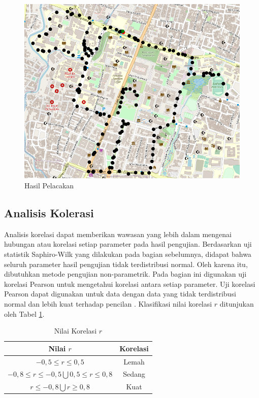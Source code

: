 \begin{figure}[H]
	\centering
	\includegraphics[width=12cm]{contents/chapter-4/pengujian-bergerak/tracked-route.png}
	\caption{Hasil Pelacakan}
	\label{Fig: moving-tracked-route}
\end{figure}

\subsection{Analisis Kolerasi}

Analisis korelasi dapat memberikan wawasan yang lebih dalam mengenai hubungan atau korelasi setiap parameter pada hasil pengujian. Berdasarkan uji statistik Saphiro-Wilk yang dilakukan pada bagian sebelumnya, didapat bahwa seluruh parameter hasil pengujian tidak terdistribusi normal. Oleh karena itu, dibutuhkan metode pengujian non-parametrik. Pada bagian ini digunakan uji korelasi Pearson untuk mengetahui korelasi antara setiap parameter. Uji korelasi Pearson dapat digunakan untuk data dengan data yang tidak terdistribusi normal dan lebih kuat terhadap pencilan \cite{Schober2018}. Klasifikasi nilai korelasi $r$ ditunjukan oleh Tabel \ref{Tab: korelasi-table}.

\begin{table}[H]
	\caption{Nilai Korelasi $r$ \cite{Carlton2012}}
	\vspace{0.5em}
	\centering
	\begin{tabular}{cc}
		\hline
		\textbf{Nilai $r$} & \textbf{Korelasi}\\
		\hline 
		$-0,5 \leq r \leq 0,5$ & Lemah \\
		$ -0,8 \le r \le -0,5 \bigcup 0,5 \le r \le 0,8$ & Sedang \\
		$r \leq -0,8 \bigcup r \geq 0,8$ & Kuat \\
		\hline
	\end{tabular}
	\label{Tab: korelasi-table}
\end{table}


